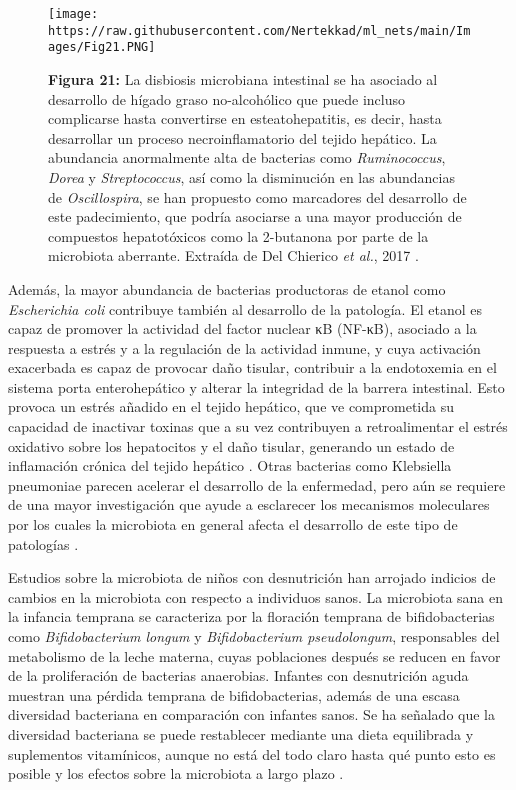 \documentclass[
]{book}
\begin{document}
\begin{figure}
\centering
\texttt{[image: https://raw.githubusercontent.com/Nertekkad/ml\_nets/main/Images/Fig21.PNG]}
\caption{\textbf{Figura 21:} La disbiosis microbiana intestinal se ha asociado al desarrollo de hígado graso no-alcohólico que puede incluso complicarse hasta convertirse en esteatohepatitis, es decir, hasta desarrollar un proceso necroinflamatorio del tejido hepático. La abundancia anormalmente alta de bacterias como \emph{Ruminococcus}, \emph{Dorea} y \emph{Streptococcus}, así como la disminución en las abundancias de \emph{Oscillospira}, se han propuesto como marcadores del desarrollo de este padecimiento, que podría asociarse a una mayor producción de compuestos hepatotóxicos como la 2-butanona por parte de la microbiota aberrante. Extraída de Del Chierico \emph{et al.}, 2017 \citep{del2017gut}.}
\end{figure}

Además, la mayor abundancia de bacterias productoras de etanol como \emph{Escherichia coli} contribuye también al desarrollo de la patología. El etanol es capaz de promover la actividad del factor nuclear κB (NF-κB), asociado a la respuesta a estrés y a la regulación de la actividad inmune, y cuya activación exacerbada es capaz de provocar daño tisular, contribuir a la endotoxemia en el sistema porta enterohepático y alterar la integridad de la barrera intestinal. Esto provoca un estrés añadido en el tejido hepático, que ve comprometida su capacidad de inactivar toxinas que a su vez contribuyen a retroalimentar el estrés oxidativo sobre los hepatocitos y el daño tisular, generando un estado de inflamación crónica del tejido hepático \citep{zhu2016gut}. Otras bacterias como Klebsiella pneumoniae parecen acelerar el desarrollo de la enfermedad, pero aún se requiere de una mayor investigación que ayude a esclarecer los mecanismos moleculares por los cuales la microbiota en general afecta el desarrollo de este tipo de patologías \citep{rao2004recent}.

Estudios sobre la microbiota de niños con desnutrición han arrojado indicios de cambios en la microbiota con respecto a individuos sanos. La microbiota sana en la infancia temprana se caracteriza por la floración temprana de bifidobacterias como \emph{Bifidobacterium longum} y \emph{Bifidobacterium pseudolongum}, responsables del metabolismo de la leche materna, cuyas poblaciones después se reducen en favor de la proliferación de bacterias anaerobias. Infantes con desnutrición aguda muestran una pérdida temprana de bifidobacterias, además de una escasa diversidad bacteriana en comparación con infantes sanos. Se ha señalado que la diversidad bacteriana se puede restablecer mediante una dieta equilibrada y suplementos vitamínicos, aunque no está del todo claro hasta qué punto esto es posible y los efectos sobre la microbiota a largo plazo \citep{smith2013gut}.
\end{document}
